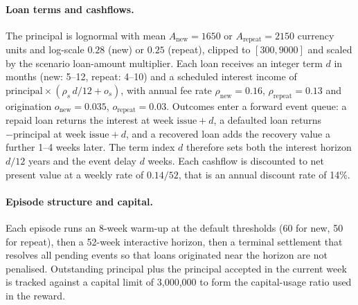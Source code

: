 \documentclass[preprint,review,authoryear,12pt]{elsarticle}
\begin{document}
\paragraph{Loan terms and cashflows.}
The principal is lognormal with mean $A_{\text{new}}=1650$ or $A_{\text{repeat}}=2150$ currency units and log-scale $0.28$ (new) or $0.25$ (repeat), clipped to $[300, 9000]$ and scaled by the scenario loan-amount multiplier. Each loan receives an integer term $d$ in months (new: 5--12, repeat: 4--10) and a scheduled interest income of $\text{principal}\times(\rho_s\, d/12 + o_s)$, with annual fee rate $\rho_{\text{new}}=0.16$, $\rho_{\text{repeat}}=0.13$ and origination $o_{\text{new}}=0.035$, $o_{\text{repeat}}=0.03$. Outcomes enter a forward event queue: a repaid loan returns the interest at week $\text{issue}+d$, a defaulted loan returns $-\text{principal}$ at week $\text{issue}+d$, and a recovered loan adds the recovery value a further 1--4 weeks later. The term index $d$ therefore sets both the interest horizon $d/12$ years and the event delay $d$ weeks. Each cashflow is discounted to net present value at a weekly rate of $0.14/52$, that is an annual discount rate of 14\%.

\paragraph{Episode structure and capital.}
Each episode runs an 8-week warm-up at the default thresholds (60 for new, 50 for repeat), then a 52-week interactive horizon, then a terminal settlement that resolves all pending events so that loans originated near the horizon are not penalised. Outstanding principal plus the principal accepted in the current week is tracked against a capital limit of 3{,}000{,}000 to form the capital-usage ratio used in the reward.
\end{document}
